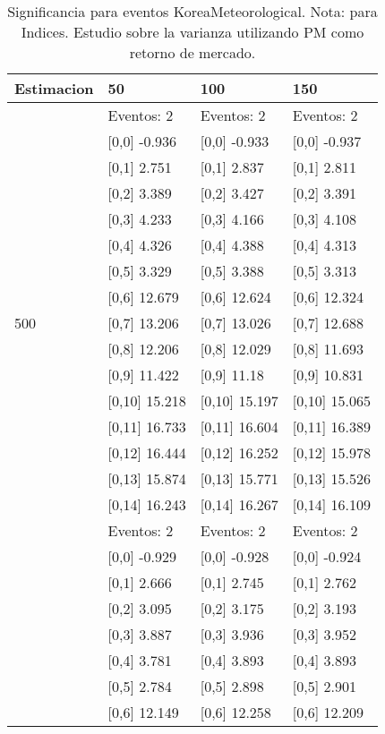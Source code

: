 \begin{table}

\caption{Significancia para eventos KoreaMeteorological. Nota: para Indices. Estudio sobre la varianza utilizando PM como retorno de mercado.}
\centering
\begin{tabular}[t]{llll}
\toprule
Estimacion & 50 & 100 & 150\\
\midrule
 & Eventos:  2 & Eventos:  2 & Eventos:  2\\
 & {}[0,0] -0.936 & {}[0,0] -0.933 & {}[0,0] -0.937\\
 & {}[0,1] 2.751 & {}[0,1] 2.837 & {}[0,1] 2.811\\
 & {}[0,2] 3.389 & {}[0,2] 3.427 & {}[0,2] 3.391\\
 & {}[0,3] 4.233 & {}[0,3] 4.166 & {}[0,3] 4.108\\
\addlinespace
 & {}[0,4] 4.326 & {}[0,4] 4.388 & {}[0,4] 4.313\\
 & {}[0,5] 3.329 & {}[0,5] 3.388 & {}[0,5] 3.313\\
 & {}[0,6] 12.679 & {}[0,6] 12.624 & {}[0,6] 12.324\\
500 & {}[0,7] 13.206 & {}[0,7] 13.026 & {}[0,7] 12.688\\
 & {}[0,8] 12.206 & {}[0,8] 12.029 & {}[0,8] 11.693\\
\addlinespace
 & {}[0,9] 11.422 & {}[0,9] 11.18 & {}[0,9] 10.831\\
 & {}[0,10] 15.218 & {}[0,10] 15.197 & {}[0,10] 15.065\\
 & {}[0,11] 16.733 & {}[0,11] 16.604 & {}[0,11] 16.389\\
 & {}[0,12] 16.444 & {}[0,12] 16.252 & {}[0,12] 15.978\\
 & {}[0,13] 15.874 & {}[0,13] 15.771 & {}[0,13] 15.526\\
\addlinespace
 & {}[0,14] 16.243 & {}[0,14] 16.267 & {}[0,14] 16.109\\
 & Eventos:  2 & Eventos:  2 & Eventos:  2\\
 & {}[0,0] -0.929 & {}[0,0] -0.928 & {}[0,0] -0.924\\
 & {}[0,1] 2.666 & {}[0,1] 2.745 & {}[0,1] 2.762\\
 & {}[0,2] 3.095 & {}[0,2] 3.175 & {}[0,2] 3.193\\
\addlinespace
 & {}[0,3] 3.887 & {}[0,3] 3.936 & {}[0,3] 3.952\\
 & {}[0,4] 3.781 & {}[0,4] 3.893 & {}[0,4] 3.893\\
 & {}[0,5] 2.784 & {}[0,5] 2.898 & {}[0,5] 2.901\\
 & {}[0,6] 12.149 & {}[0,6] 12.258 & {}[0,6] 12.209\\

\end{tabular}
\end{table}
